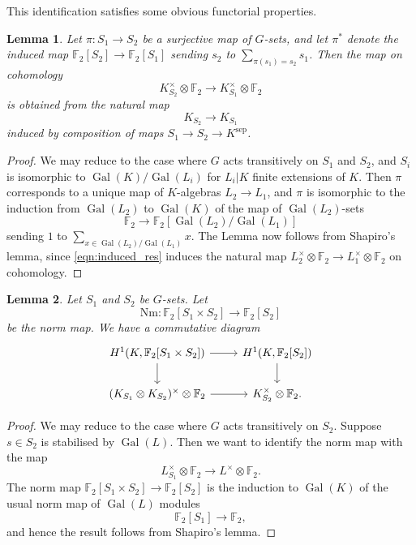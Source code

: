 \documentclass[11pt]{amsart}
\def\F{\mathbb F}
\theoremstyle{plain}
\newtheorem{lemma}{Lemma}
\theoremstyle{definition}
\DeclareMathOperator{\Gal}{Gal}
\newcommand{\sep}{\mathrm{sep}}
\newcommand{\Nm}{\mathrm{Nm}}
\begin{document}
This identification satisfies some obvious functorial properties.
\begin{lemma}\label{lemma:the_obvious_one}
Let $\pi :S_1 \to S_2 $ be a surjective map of $G$-sets, and let $\pi ^*$ denote the induced map $\F _2 [S_2 ]\to \F _2 [S_1 ]$ sending $s_2 $ to $\sum _{\pi (s_1 )=s_2 }s_1 $. Then the map on cohomology
\[
K_{S_2 }^\times \otimes \F _2 \to K_{S_1 }^\times \otimes \F _2 
\]
is obtained from the natural map
\[
K_{S_2 }\to K_{S_1 }
\]
induced by composition of maps $S_1 \to S_2 \to K^{\sep }$.
\end{lemma}
\begin{proof}
We may reduce to the case where $G$ acts transitively on $S_1 $ and $S_2 $, and $S_i $ is isomorphic to $\Gal (K)/\Gal (L_i )$ for $L_i |K$ finite extensions of $K$. Then $\pi $ corresponds to a unique map of $K$-algebras $L_2 \to L_1 $, and $\pi $ is isomorphic to the induction from $\Gal (L_2 )$ to $\Gal (K)$ of the map of $\Gal (L_2 )$-sets
\begin{equation}\label{eqn:induced_res}
\F_2 \to \F _2 [\Gal (L_2 )/\Gal (L_1 )]
\end{equation}
sending $1$ to $\sum _{x\in \Gal (L_2 )/\Gal (L_1 )}x$. The Lemma now follows from Shapiro's lemma, since \eqref{eqn:induced_res} induces the natural map $L_2 ^\times \otimes \F _2 \to L_1 ^\times \otimes \F _2 $ on cohomology.
\end{proof}

\begin{lemma}\label{lemma:norm_is_norm}
Let $S_1 $ and $S_2 $ be $G$-sets. Let 
\[
\Nm :\F _2 [S_1 \times S_2 ]\to \F _2 [S_2 ]
\]
be the norm map.
We have a commutative diagram
\[
\begin{tikzcd}
H^1 (K ,\F _2 [S_1 \times S_2 ]) \arrow[r] \arrow[d] & H^1 (K ,\F _2 [S_2 ]) \arrow[d] \\
(K_{S_1 }\otimes K_{S_2 })^\times \otimes \F _2 \arrow[r] &  K_{S_2 }^\times \otimes \F _2 .          
\end{tikzcd}
\]
\end{lemma}
\begin{proof}
We may reduce to the case where $G$ acts transitively on $S_2 $. Suppose $s\in S_2 $ is stabilised by $\Gal (L)$. Then we want to identify the norm map with the map
\[
L_{S_1 }^\times \otimes \F _2 \to L^\times \otimes \F _2 .
\]
The norm map $\F _2 [S_1 \times S_2 ]\to \F _2 [S_2 ]$ is the induction to $\Gal (K)$ of the usual norm map of $\Gal (L)$ modules
\[
\F _2 [S_1 ]\to \F _2 ,
\]
and hence the result follows from Shapiro's lemma.
\end{proof}
\end{document}
